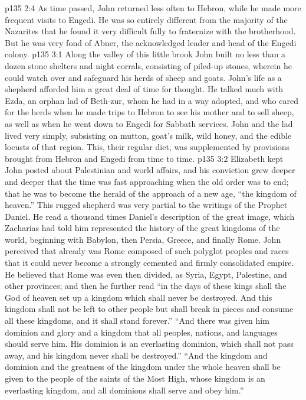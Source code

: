 \vs p135 2:4 As time passed, John returned less often to Hebron, while he made more frequent visits to Engedi. He was so entirely different from the majority of the Nazarites that he found it very difficult fully to fraternize with the brotherhood. But he was very fond of Abner, the acknowledged leader and head of the Engedi colony.
\vs p135 3:1 Along the valley of this little brook John built no less than a dozen stone shelters and night corrals, consisting of piled\hyp{}up stones, wherein he could watch over and safeguard his herds of sheep and goats. John’s life as a shepherd afforded him a great deal of time for thought. He talked much with Ezda, an orphan lad of Beth\hyp{}zur, whom he had in a way adopted, and who cared for the herds when he made trips to Hebron to see his mother and to sell sheep, as well as when he went down to Engedi for Sabbath services. John and the lad lived very simply, subsisting on mutton, goat’s milk, wild honey, and the edible locusts of that region. This, their regular diet, was supplemented by provisions brought from Hebron and Engedi from time to time.
\pc \vs p135 3:2 Elizabeth kept John posted about Palestinian and world affairs, and his conviction grew deeper and deeper that the time was fast approaching when the old order was to end; that he was to become the herald of the approach of a new age, “the kingdom of heaven.” This rugged shepherd was very partial to the writings of the Prophet Daniel. He read a thousand times Daniel’s description of the great image, which Zacharias had told him represented the history of the great kingdoms of the world, beginning with Babylon, then Persia, Greece, and finally Rome. John perceived that already was Rome composed of such polyglot peoples and races that it could never become a strongly cemented and firmly consolidated empire. He believed that Rome was even then divided, as Syria, Egypt, Palestine, and other provinces; and then he further read “in the days of these kings shall the God of heaven set up a kingdom which shall never be destroyed. And this kingdom shall not be left to other people but shall break in pieces and consume all these kingdoms, and it shall stand forever.” “And there was given him dominion and glory and a kingdom that all peoples, nations, and languages should serve him. His dominion is an everlasting dominion, which shall not pass away, and his kingdom never shall be destroyed.” “And the kingdom and dominion and the greatness of the kingdom under the whole heaven shall be given to the people of the saints of the Most High, whose kingdom is an everlasting kingdom, and all dominions shall serve and obey him.”
